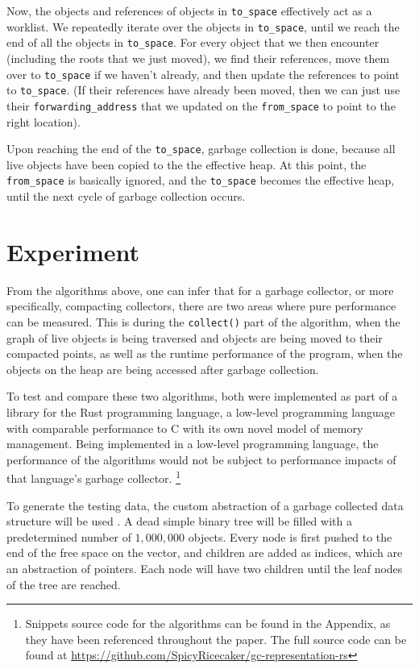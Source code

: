 \documentclass[index]{subfiles}
\begin{document}
Now, the objects and references of objects in \verb+to_space+ effectively act as a worklist. We repeatedly iterate over the objects in \verb+to_space+, until we reach the end of all the objects in \verb+to_space+. For every object that we then encounter (including the roots that we just moved), we find their references, move them over to \verb+to_space+ if we haven't already, and then update the references to point to \verb+to_space+. (If their references have already been moved, then we can just use their \verb+forwarding_address+ that we updated on the \verb+from_space+ to point to the right location).

Upon reaching the end of the \verb+to_space+, garbage collection is done, because all live objects have been copied to the the effective heap. At this point, the \verb+from_space+ is basically ignored, and the \verb+to_space+ becomes the effective heap, until the next cycle of garbage collection occurs.


\section{Experiment}

From the algorithms above, one can infer that for a garbage collector, or more specifically, compacting collectors, there are two areas where pure performance can be measured. This is during the \verb+collect()+ part of the algorithm, when the graph of live objects is being traversed and objects are being moved to their compacted points, as well as the runtime performance of the program, when the objects on the heap are being accessed after garbage collection.

To test and compare these two algorithms, both were implemented as part of a library for the Rust programming language, a low-level programming language with comparable performance to C with its own novel model of memory management. Being implemented in a low-level programming language, the performance of the algorithms would not be subject to performance impacts of that language's garbage collector. \footnote{Snippets source code for the algorithms can be found in the Appendix, as they have been referenced throughout the paper. The full source code can be found at \href{https://github.com/SpicyRicecaker/gc-representation-rs}{https://github.com/SpicyRicecaker/gc-representation-rs}}

To generate the testing data, the custom abstraction of a garbage collected data structure will be used \cite{youtube_introductory_video}. A dead simple binary tree will be filled with a predetermined number of \(1,000,000\) objects. Every node is first pushed to the end of the free space on the vector, and children are added as indices, which are an abstraction of pointers. Each node will have two children until the leaf nodes of the tree are reached.
\end{document}

